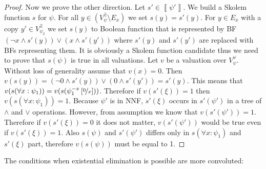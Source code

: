 \documentclass[
  digital, %
  twoside, %
  table,   %
  nolof,     %
  nolot,     %
]{fithesis3}
\newtheorem{lemma}[theorem]{Lemma}         %
\theoremstyle{definition}
\theoremstyle{remark}
\newcommand{\seman}[1]{\left\llbracket {#1} \right\rrbracket}
\newcommand{\substitute}[2]{\left[ \nicefrac{#2}{#1} \right]}
\newcommand{\DQBF}[1]{\mathbf{\Phi}_{#1}^{\text{\tiny dnnf}}}
\newcommand{\evars}[1]{V_{#1}^{\exists}}
\newcommand{\uvars}[1]{V_{#1}^{\forall}}
\begin{document}
\begin{proof}
  Now we prove the other direction. Let $s' \in \seman{\psi'}$. We build a Skolem function $s$ for $\psi$. For all $y \in (\evars{\psi} \setminus E_x)$ we set $s(y) = s'(y)$. For $y \in E_x$ with a copy $y' \in \evars{\psi_2}$ we set $s(y)$ to Boolean function that is represented by BF $(\neg x \land s'(y)) \lor (x \land s'(y'))$ where $s'(y)$ and $s'(y')$ are replaced with BFs representing them. It is obviously a Skolem function candidate thus we need to prove that $s(\psi)$ is true in all valuations. Let $v$ be a valuation over $\uvars{\psi}$. Without loss of generality assume that $v(x) = 0$. Then $v(s(y)) = (\neg 0 \land s'(y)) \lor (0 \land s'(y')) = s'(y)$. This means that $v(s(\forall x : \psi_1)) = v(s(\psi_1^{-x}\substitute{x}{0}))$. Therefore if $v(s'(\xi)) = 1$ then $v(s(\forall x : \psi_1)) = 1$. Because $\psi'$ is in NNF, $s'(\xi)$ occurs in $s'(\psi')$ in a tree of ${\land}$ and ${\lor}$ operations. However, from assumption we know that $v(s'(\psi')) = 1$. Therefore if $v(s'(\xi)) = 0$ it does not matter, $v(s'(\psi'))$ would be true even if $v(s'(\xi)) = 1$. Also $s(\psi)$ and $s'(\psi')$ differs only in $s(\forall x : \psi_1)$ and $s'(\xi)$ part, therefore $v(s(\psi))$ must be equal to 1. 
\end{proof}


The conditions when existential elimination is possible are more convoluted:
\end{document}

